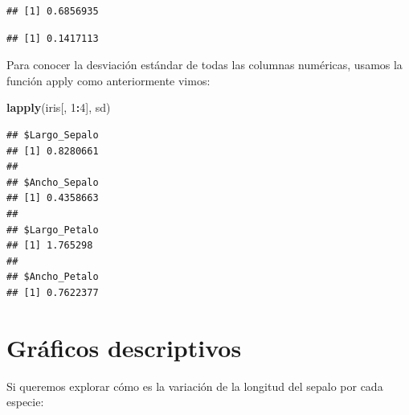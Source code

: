 \documentclass[
]{book}
\newenvironment{Shaded}{\begin{snugshade}}{\end{snugshade}}
\newcommand{\CommentTok}[1]{\textcolor[rgb]{0.56,0.35,0.01}{\textit{#1}}}
\newcommand{\DecValTok}[1]{\textcolor[rgb]{0.00,0.00,0.81}{#1}}
\newcommand{\FunctionTok}[1]{\textcolor[rgb]{0.13,0.29,0.53}{\textbf{#1}}}
\newcommand{\NormalTok}[1]{#1}
\newcommand{\SpecialCharTok}[1]{\textcolor[rgb]{0.81,0.36,0.00}{\textbf{#1}}}
\begin{document}
\begin{verbatim}
## [1] 0.6856935
\end{verbatim}

\begin{Shaded}
\end{Shaded}

\begin{verbatim}
## [1] 0.1417113
\end{verbatim}

\hfill\break
Para conocer la desviación estándar de todas las columnas numéricas, usamos la función apply como anteriormente vimos:\\

\begin{Shaded}
\begin{Highlighting}[]
\FunctionTok{lapply}\NormalTok{(iris[, }\DecValTok{1}\SpecialCharTok{:}\DecValTok{4}\NormalTok{], sd)}
\end{Highlighting}
\end{Shaded}

\begin{verbatim}
## $Largo_Sepalo
## [1] 0.8280661
## 
## $Ancho_Sepalo
## [1] 0.4358663
## 
## $Largo_Petalo
## [1] 1.765298
## 
## $Ancho_Petalo
## [1] 0.7622377
\end{verbatim}

\newpage

\section{Gráficos descriptivos}\label{gruxe1ficos-descriptivos}

Si queremos explorar cómo es la variación de la longitud del sepalo por cada especie:\\

\begin{Shaded}
\end{Shaded}
\end{document}
